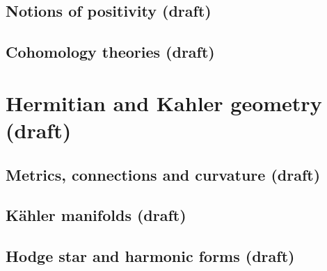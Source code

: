 \documentclass[sectionlevel=book]{noteformyself}
\begin{document}
        \section{Notions of positivity (draft)}
        
        \section{Cohomology theories (draft)}
        

    \chapter{Hermitian and Kahler geometry (draft)}
        \section{Metrics, connections and curvature (draft)}
        
        \section{Kähler manifolds (draft)}
        
        \section{Hodge star and harmonic forms (draft)}
        

\end{document}
